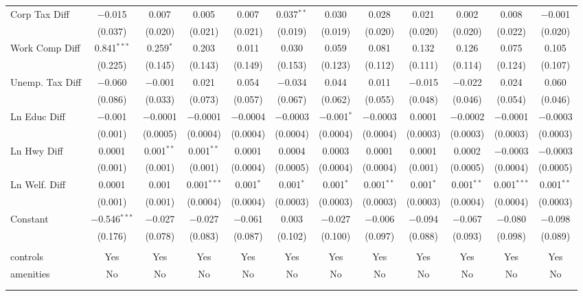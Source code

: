 \begin{table}[!htbp]
\begin{tabular}{@{\extracolsep{5pt}}lccccccccccc}
  Corp Tax Diff & $-$0.015 & 0.007 & 0.005 & 0.007 & 0.037$^{**}$ & 0.030 & 0.028 & 0.021 & 0.002 & 0.008 & $-$0.001 \\ 
  & (0.037) & (0.020) & (0.021) & (0.021) & (0.019) & (0.019) & (0.020) & (0.020) & (0.020) & (0.022) & (0.020) \\ 
  Work Comp Diff & 0.841$^{***}$ & 0.259$^{*}$ & 0.203 & 0.011 & 0.030 & 0.059 & 0.081 & 0.132 & 0.126 & 0.075 & 0.105 \\ 
  & (0.225) & (0.145) & (0.143) & (0.149) & (0.153) & (0.123) & (0.112) & (0.111) & (0.114) & (0.124) & (0.107) \\ 
  Unemp. Tax Diff & $-$0.060 & $-$0.001 & 0.021 & 0.054 & $-$0.034 & 0.044 & 0.011 & $-$0.015 & $-$0.022 & 0.024 & 0.060 \\ 
  & (0.086) & (0.033) & (0.073) & (0.057) & (0.067) & (0.062) & (0.055) & (0.048) & (0.046) & (0.054) & (0.046) \\ 
  Ln Educ Diff & $-$0.001 & $-$0.0001 & $-$0.0001 & $-$0.0004 & $-$0.0003 & $-$0.001$^{*}$ & $-$0.0003 & 0.0001 & $-$0.0002 & $-$0.0001 & $-$0.0003 \\ 
  & (0.001) & (0.0005) & (0.0004) & (0.0004) & (0.0004) & (0.0004) & (0.0004) & (0.0003) & (0.0003) & (0.0003) & (0.0003) \\ 
  Ln Hwy Diff & 0.0001 & 0.001$^{**}$ & 0.001$^{**}$ & 0.0001 & 0.0004 & 0.0003 & 0.0001 & 0.0001 & 0.0002 & $-$0.0003 & $-$0.0003 \\ 
  & (0.001) & (0.001) & (0.001) & (0.0004) & (0.0005) & (0.0004) & (0.0004) & (0.001) & (0.0005) & (0.0004) & (0.0005) \\ 
  Ln Welf. Diff & 0.0001 & 0.001 & 0.001$^{***}$ & 0.001$^{*}$ & 0.001$^{*}$ & 0.001$^{*}$ & 0.001$^{**}$ & 0.001$^{*}$ & 0.001$^{**}$ & 0.001$^{***}$ & 0.001$^{**}$ \\ 
  & (0.001) & (0.001) & (0.0004) & (0.0004) & (0.0003) & (0.0003) & (0.0003) & (0.0003) & (0.0004) & (0.0004) & (0.0003) \\ 
  Constant & $-$0.546$^{***}$ & $-$0.027 & $-$0.027 & $-$0.061 & 0.003 & $-$0.027 & $-$0.006 & $-$0.094 & $-$0.067 & $-$0.080 & $-$0.098 \\ 
  & (0.176) & (0.078) & (0.083) & (0.087) & (0.102) & (0.100) & (0.097) & (0.088) & (0.093) & (0.098) & (0.089) \\ 
 \hline \\[-1.8ex] 
controls & Yes & Yes & Yes & Yes & Yes & Yes & Yes & Yes & Yes & Yes & Yes \\ 
amenities & No & No & No & No & No & No & No & No & No & No & No \\ 
\hline \\[-1.8ex] 
\hline 
\hline \\[-1.8ex] 
\end{tabular} 
\end{table} 
